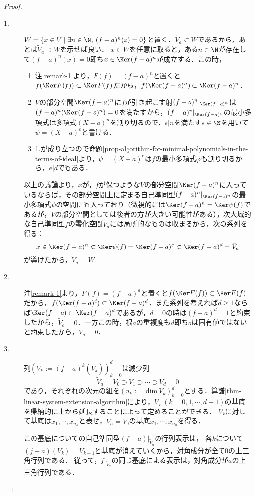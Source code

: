 \documentclass[uplatex, dvipdfmx]{jsreport}
\begin{document}
\begin{proof}\mbox{}
    \begin{description}
        \item[1.] $W=\{x\in V\mid\exists n\in\N,\; (f-a)^n(x)=0\}$と置く．$\tilde{V}_a\subset W$であるから，あとは$\tilde{V}_a\supset W$を示せば良い．
        $x\in W$を任意に取ると，ある$n\in\N$が存在して$(f-a)^n(x)=0$即ち$x\in\Ker(f-a)^n$が成立する．この時，
        \begin{enumerate}[(1)]
            \item 注\ref{remark-1}より，$F(f)=(f-a)^n$と置くと$f(\Ker F(f))\subset\Ker F(f)$だから，$f(\Ker(f-a)^n)\subset\Ker(f-a)^n$．
            \item $V$の部分空間$\Ker(f-a)^n$に$f$が引き起こす射$(f-a)^n|_{\Ker(f-a)^n}$は$(f-a)^n(\Ker(f-a)^n)=0$を満たすから，$(f-a)^n|_{\Ker(f-a)^n}$の最小多項式は多項式$(X-a)^n$を割り切るので，$e|n$を満たす$e\in\N$を用いて$\psi=(X-a)^e$と書ける．
            \item 1.が成り立つので命題\ref{prop-algorithm-for-minimal-polynomials-in-the-terms-of-ideal}より，$\psi=(X-a)^e$は$f$の最小多項式$\varphi$も割り切るから，$e|d$でもある．
        \end{enumerate}
        以上の議論より，$x$が，$f$が保つような$V$の部分空間$\Ker(f-a)^n$に入っているならば，その部分空間上に定まる自己準同型$(f-a)^n|_{\Ker(f-a)^n}$の最小多項式$\psi$の空間にも入っており（微視的には$\Ker(f-a)^n=\Ker\psi(f)$であるが，$V$の部分空間としては後者の方が大きい可能性がある），次大域的な自己準同型$f$の零化空間$\tilde{V}_a$には局所的なものは収まるから，次の系列を得る：
        \[ x\in\Ker(f-a)^n\subset\Ker\psi(f)=\Ker(f-a)^e\subset\Ker(f-a)^d=\tilde{V}_a \]
        が導けたから，$\tilde{V}_a=W$．
        \item[2.] 注\ref{remark-1}より，$F(f)=(f-a)^d$と置くと$f(\Ker F(f))\subset\Ker F(f)$だから，$f(\Ker(f-a)^d)\subset\Ker(f-a)^d$．また系列を考えれば$d\ge 1$ならば$\Ker(f-a)\subset\Ker(f-a)^d$であるが，$d=0$の時は$(f-a)^d=1$と約束したから，$\tilde{V}_a=0$．一方この時，根$a$の重複度も$d$即ち$a$は固有値ではないと約束したから，$V_a=0$．
        \item[3.] 列$(V_k:=(f-a)^k(\tilde{V}_a))^d_{k=0}$は減少列
            \[\tilde{V}_a=V_0\supset V_1\supset\cdots\supset V_d=0\]
            であり，それぞれの次元の組を$(n_k:=\dim V_k)_{k=0}^d$とする．算譜\ref{thm-linear-system-extension-algorithm}により，$V_k\;(k=0,1,\cdots,d-1)$の基底を帰納的に上から延長することによって定めることができる．
            $V_k$に対して基底は$x_1,\cdots,x_{n_k}$と表せ，$\tilde{V}_a=V_0$の基底$x_1,\cdots,x_{n_0}$を得る．
            
            この基底についての自己準同型$(f-a)|_{\tilde{V}_a}$の行列表示は，
            各$k$について$(f-a)(V_k)=V_{k+1}$と基底が消えていくから，対角成分が全て$0$の上三角行列である．
            従って，$f|_{\tilde{V}_a}$の同じ基底による表示は，対角成分が$a$の上三角行列である．
    \end{description}
\end{proof}
\end{document}
